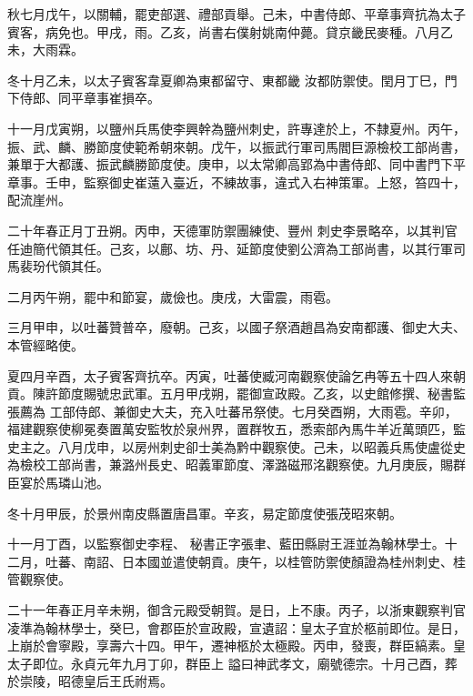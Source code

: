 \begin{pinyinscope}
 秋七月戊午，以關輔，罷吏部選、禮部貢舉。己未，中書侍郎、平章事齊抗為太子賓客，病免也。甲戌，雨。乙亥，尚書右僕射姚南仲薨。貸京畿民麥種。八月乙未，大雨霖。



 冬十月乙未，以太子賓客韋夏卿為東都留守、東都畿
 汝都防禦使。閏月丁巳，門下侍郎、同平章事崔損卒。



 十一月戊寅朔，以鹽州兵馬使李興幹為鹽州刺史，許專達於上，不隸夏州。丙午，振、武、麟、勝節度使範希朝來朝。戊午，以振武行軍司馬閻巨源檢校工部尚書，兼單于大都護、振武麟勝節度使。庚申，以太常卿高郢為中書侍郎、同中書門下平章事。壬申，監察御史崔薳入臺近，不練故事，違式入右神策軍。上怒，笞四十，配流崖州。



 二十年春正月丁丑朔。丙申，天德軍防禦團練使、豐州
 刺史李景略卒，以其判官任迪簡代領其任。己亥，以鄜、坊、丹、延節度使劉公濟為工部尚書，以其行軍司馬裴玢代領其任。



 二月丙午朔，罷中和節宴，歲儉也。庚戌，大雷震，雨雹。



 三月甲申，以吐蕃贊普卒，廢朝。己亥，以國子祭酒趙昌為安南都護、御史大夫、本管經略使。



 夏四月辛酉，太子賓客齊抗卒。丙寅，吐蕃使臧河南觀察使論乞冉等五十四人來朝貢。陳許節度賜號忠武軍。五月甲戌朔，罷御宣政殿。乙亥，以史館修撰、秘書監張薦為
 工部侍郎、兼御史大夫，充入吐蕃吊祭使。七月癸酉朔，大雨雹。辛卯，福建觀察使柳冕奏置萬安監牧於泉州界，置群牧五，悉索部內馬牛羊近萬頭匹，監史主之。八月戊申，以房州刺史卻士美為黔中觀察使。己未，以昭義兵馬使盧從史為檢校工部尚書，兼潞州長史、昭義軍節度、澤潞磁邢洺觀察使。九月庚辰，賜群臣宴於馬璘山池。



 冬十月甲辰，於景州南皮縣置唐昌軍。辛亥，易定節度使張茂昭來朝。



 十一月丁酉，以監察御史李程、
 秘書正字張聿、藍田縣尉王涯並為翰林學士。十二月，吐蕃、南詔、日本國並遣使朝貢。庚午，以桂管防禦使顏證為桂州刺史、桂管觀察使。



 二十一年春正月辛未朔，御含元殿受朝賀。是日，上不康。丙子，以浙東觀察判官凌準為翰林學士，癸巳，會郡臣於宣政殿，宣遺詔：皇太子宜於柩前即位。是日，上崩於會寧殿，享壽六十四。甲午，遷神柩於太極殿。丙申，發喪，群臣縞素。皇太子即位。永貞元年九月丁卯，群臣上
 謚曰神武孝文，廟號德宗。十月己酉，葬於崇陵，昭德皇后王氏祔焉。




\end{pinyinscope}
